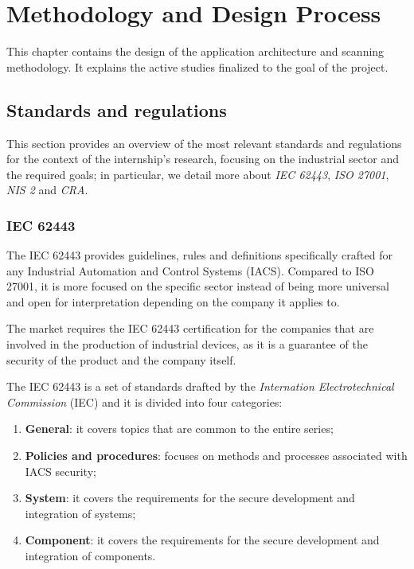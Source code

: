 \chapter{Methodology and Design Process}

This chapter contains the design of the application architecture and scanning methodology. It explains the active studies finalized to the goal of the project.

\section{Standards and regulations}

This section provides an overview of the most relevant standards and regulations for the context of the internship's research, focusing on the industrial sector and the required goals; in particular, we detail more about \textit{IEC 62443}, \textit{ISO 27001}, \textit{NIS 2} and \textit{CRA}.

\subsection{IEC 62443}
\label{sec:iec-62443}

The IEC 62443 provides guidelines, rules and definitions specifically crafted for any Industrial Automation and Control Systems (IACS). Compared to ISO 27001, it is more focused on the specific sector instead of being more universal and open for interpretation depending on the company it applies to.

The market requires the IEC 62443 certification for the companies that are involved in the production of industrial devices, as it is a guarantee of the security of the product and the company itself.

The IEC 62443 is a set of standards drafted by the \textit{Internation Electrotechnical Commission} (IEC) and it is divided into four categories:~\cite{understanding-iec-62443-parts}
\begin{enumerate}
  \item \textbf{General}: it covers topics that are common to the entire series;
  \item \textbf{Policies and procedures}: focuses on methods and processes associated with IACS security;
  \item \textbf{System}: it covers the requirements for the secure development and integration of systems;
  \item \textbf{Component}: it covers the requirements for the secure development and integration of components.
\end{enumerate}


